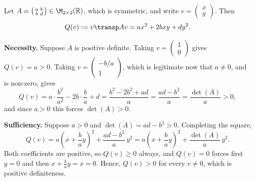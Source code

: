 \begin{exercisesolution}
\label{sol:pos_def_examples_real_b}
  Let $A = \left(\begin{smallmatrix} a & b \\ b & d \end{smallmatrix}\right) \in \M_{2 \times 2}(\mathbb{R})$, which is symmetric, and write $v = \left(\begin{smallmatrix} x \\ y \end{smallmatrix}\right)$. Then
  \[ Q(v) := v\transp A v = a x^2 + 2bxy + d y^2. \]

  \textbf{Necessity.} Suppose $A$ is positive definite. Taking $v = \left(\begin{smallmatrix} 1 \\ 0 \end{smallmatrix}\right)$ gives $Q(v) = a > 0$. Taking $v = \left(\begin{smallmatrix} -b/a \\ 1 \end{smallmatrix}\right)$, which is legitimate now that $a \ne 0$, and is non-zero, gives
  \[ Q(v) = a \cdot \frac{b^2}{a^2} - 2b \cdot \frac{b}{a} + d = \frac{b^2 - 2b^2 + ad}{a} = \frac{ad - b^2}{a} = \frac{\det(A)}{a} > 0, \]
  and since $a > 0$ this forces $\det(A) > 0$.

  \textbf{Sufficiency.} Suppose $a > 0$ and $\det(A) = ad - b^2 > 0$. Completing the square,
  \begin{equation} \label{eq:complete_square_real}
    Q(v) = a \left( x + \frac{b}{a} y \right)^2 + \frac{ad - b^2}{a} \, y^2 = a \left( x + \frac{b}{a} y \right)^2 + \frac{\det(A)}{a} \, y^2 .
  \end{equation}
  Both coefficients are positive, so $Q(v) \ge 0$ always, and $Q(v) = 0$ forces first $y = 0$ and then $x + \frac{b}{a}y = x = 0$. Hence, $Q(v) > 0$ for every $v \ne 0$, which is positive definiteness.
\end{exercisesolution}

